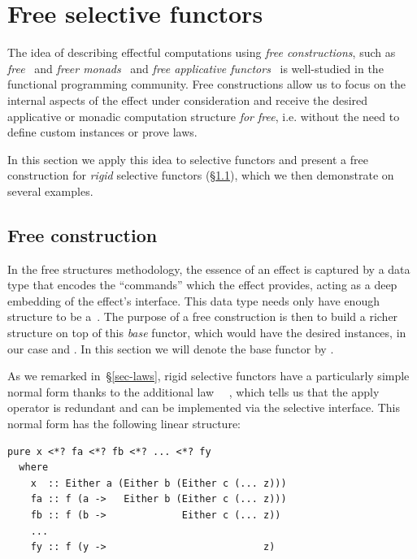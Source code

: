 \section{Free selective functors}\label{sec-free}

The idea of describing effectful computations using \emph{free constructions},
such as \emph{free}~\cite{swierstra2008data} and \emph{freer
monads}~\cite{kiselyov2015freer} and \emph{free applicative
functors}~\cite{free-applicatives} is well-studied in the functional programming
community. Free constructions allow us to focus on the internal aspects of the
effect under consideration and receive the desired applicative or monadic
computation structure \emph{for free}, i.e. without the need to define custom
instances or prove laws.

In this section we apply this idea to selective functors and present a free
construction for \emph{rigid} selective functors
(\S\ref{sec-free-construction}), which we then demonstrate on several examples.

\subsection{Free construction}\label{sec-free-construction}

In the free structures methodology, the essence of an effect is captured by a
data type that encodes the ``commands'' which the effect provides, acting as a
deep embedding of the effect's interface. This data type needs only have enough
structure to be a~. The purpose of a free construction is then to
build a richer structure on top of this \emph{base} functor, which would have
the desired instances, in our case  and . In this
section we will denote the base functor by .

As we remarked in~\S\ref{sec-laws}, rigid selective functors have a particularly
simple normal form thanks to the additional law \hs{(<*>)}~\hs{=}~,
which tells us that the apply operator \hs{<*>} is redundant and can be
implemented via the selective interface. This normal form has the following
linear structure:

\vspace{1mm}
\begin{verbatim}
pure x <*? fa <*? fb <*? ... <*? fy
  where
    x  :: Either a (Either b (Either c (... z)))
    fa :: f (a ->   Either b (Either c (... z)))
    fb :: f (b ->             Either c (... z))
    ...
    fy :: f (y ->                           z)
\end{verbatim}
\vspace{1mm}

